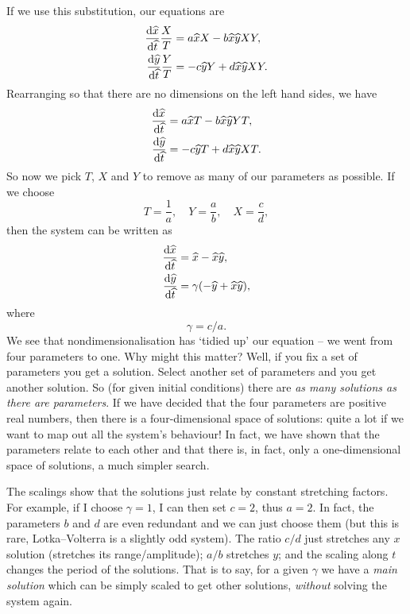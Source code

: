 \documentclass[main.tex]{subfiles}
\begin{document}
If we use this substitution, our equations are
\begin{subequations}
\begin{align}
\fd{\hat x}{\hat t}\frac{X}{T} &= a\hat{x}X - b\hat{x}\hat{y}XY,\\
\fd{\hat y}{\hat t}\frac{Y}{T} &= -c\hat{y}Y + d\hat{x}\hat{y}XY.
\end{align}
\end{subequations}
Rearranging so that there are no dimensions on the left hand sides, we have
\begin{subequations}
\begin{align}
\fd{\hat x}{\hat t} &= a\hat{x}T - b\hat{x}\hat{y}YT,\\
\fd{\hat y}{\hat t} &= -c\hat{y}T + d\hat{x}\hat{y}XT.
\end{align}
\end{subequations}
So now we pick $T$, $X$ and $Y$ to remove as many of our parameters as possible. If we choose
\begin{equation}
	\label{TYX-scaling}
	T = \frac{1}{a}, \quad Y = \frac{a}{b}, \quad X = \frac{c}{d},
\end{equation}
then the system can be written as 
\begin{subequations}
\label{reducedlotvol}
\begin{align}
\fd{\hat{x}}{\hat{t}} &= \hat{x} - \hat{x}\hat{y},\\
\fd{\hat{y}}{\hat{t}} &= \gamma(-\hat{y} +\hat{x}\hat{y}),
\end{align}
\end{subequations}
where 
\begin{equation}
\gamma = c/a.
\end{equation}
We see that nondimensionalisation has `tidied up’ our equation -- we went from four parameters to one. Why might this matter? Well, if you fix a set of parameters you get a solution. Select another set of parameters and you get another solution. So (for given initial conditions) there are \emph{as many solutions as there are parameters}. If we have decided that the four parameters are positive real numbers, then there is a four-dimensional space of solutions: quite a lot if we want to map out all the system's behaviour! In fact, we have shown that the parameters relate to each other and that there is, in fact, only a one-dimensional space of solutions, a much simpler search.  

The scalings show that the solutions just relate by constant stretching factors. For example, if I choose $\gamma=1$, I can then set $c=2$, thus $a=2$. In fact, the parameters $b$ and $d$ are even redundant and we can just choose them (but this is rare, Lotka--Volterra is a slightly odd system). The ratio $c/d$ just stretches any $x$ solution (stretches its range/amplitude); $a/b$ stretches $y$; and the scaling along $t$ changes the period of the solutions. That is to say, for a given $\gamma$ we have a \emph{main solution} which can be simply scaled to get other solutions, \emph{without} solving the system again. 
\end{document}
